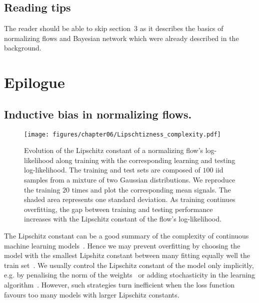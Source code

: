 \subsection{Reading tips}
The reader should be able to skip section~3 as it describes the basics of normalizing flows and Bayesian network which were already described in the background.



\section{Epilogue}

\subsection{Inductive bias in normalizing flows.}
\begin{figure}
  \centering
  \texttt{[image: figures/chapter06/Lipschtizness\_complexity.pdf]}
  \caption{Evolution of the Lipschitz constant of a normalizing flow's log-likelihood along training with the corresponding learning and testing log-likelihood. The training and test sets are composed of $100$ iid samples from a mixture of two Gaussian distributions. We reproduce the training $20$ times and plot the corresponding mean signals. The shaded area represents one standard deviation. As training continues overfitting, the gap between training and testing performance increases with the Lipschitz constant of the flow's log-likelihood.}
  \label{fig:flow_Lipschtizness}
\end{figure}
The Lipschitz constant can be a good summary of the complexity of continuous machine learning models~\citep{virmaux2018lipschitz, weng2018evaluating, bartlett2017spectrally}. Hence we may prevent overfitting by choosing the model with the smallest Lipshitz constant between many fitting equally well the train set~\citep{von2004distance}. We usually control the Lipschitz constant of the model only implicitly, e.g. by penalising the norm of the weights~\citep{krogh1991simple} or adding stochasticity in the learning algorithm~\citep{smith2021origin, bottou2012stochastic}. However, such strategies turn inefficient when the loss function favours too many models with larger Lipschitz constants.

